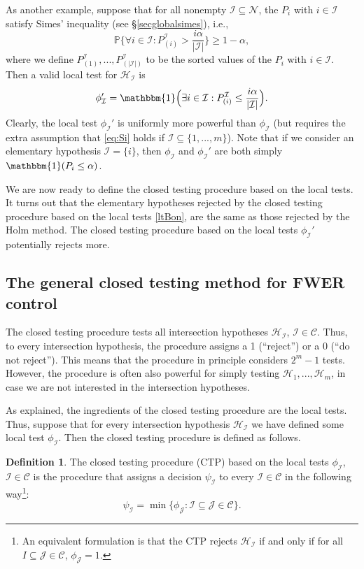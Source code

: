 \documentclass[11pt]{article}
\theoremstyle{plain}
\theoremstyle{definition}
\newtheorem{definition}{Definition}[section]
\newcommand{\N}{\mathcal{N}}
\newcommand{\I}{\mathcal{I}}
\newcommand{\J}{\mathcal{J}}
\newcommand{\Hy}{\mathcal{H}}
\newcommand{\pr}{\mathbb{P}}
\newcommand{\subs}{\mathcal{C}}
\begin{document}
As another example, suppose that for all nonempty $\I\subseteq \N$, the $P_i$ with $i\in \I$ satisfy Simes' inequality (see \S\ref{secglobalsimes}), i.e., 
\begin{equation} \label{eq:Si}
\pr\Big\{\forall i \in \I: P_{(i)}^{\I}> \frac{i\alpha}{|\I|}\Big\}\geq1-\alpha,
\end{equation}
where we define $P_{(1)}^{\I},..., P_{(|\I|)}^{\I}$ to be  the sorted values of the $P_i$ with $i\in \I$.
 Then a valid local test for 
$\Hy_{\I}$ is 
\begin{equation} \label{lotestSimes}
\phi_{\I}'=\mathbbm{1}\Big(\exists i \in \I: P_{(i)}^{\I}  \leq \frac{i\alpha}{|\I|} \Big).
\end{equation}
Clearly, the local test $\phi_{\I}'$ is uniformly more powerful than $\phi_{\I}$ (but requires the extra assumption that \eqref{eq:Si} holds if $\I\subseteq \{1,...,m\}$). Note that if we consider an elementary hypothesis $\I=\{i\}$, then $\phi_{\I}$ and $\phi_{\I}'$ are both  simply $\mathbbm{1}(P_i\leq \alpha)$.

We are now ready to define the closed testing procedure based on the local tests. It turns out that the elementary hypotheses rejected by  the closed testing procedure based on the local tests \eqref{ltBon}, are the same as those rejected by the Holm method. The closed testing procedure based on the local tests $\phi_{\I}'$ potentially rejects more.


\subsection{The general closed testing method for FWER control} \label{secCTPgeneral}
The closed testing procedure  tests  all  intersection hypotheses $\Hy_{\I}$, $\I\in \subs$. Thus, to every intersection hypothesis, the procedure assigns a 1 (``reject'') or a 0 (``do not reject''). This means that the procedure in principle  considers $2^m-1$ tests. However, the procedure is often also powerful  for simply testing $\Hy_1,...,\Hy_m$, in case we are not interested in the intersection hypotheses. 

As explained, the ingredients of the closed testing procedure are the local tests. Thus, suppose that for every intersection hypothesis $\Hy_{\I}$ we have defined some local test  $\phi_{\I}$. Then the closed testing procedure is defined as follows.

\begin{definition} \label{defctp}
The closed testing procedure (CTP) based on the local tests $\phi_{\I}$, $\I\in \subs$ is the 
procedure that assigns a  decision $\psi_{\I}$ to every $\I\in \subs$ in the following way\footnote{An equivalent formulation is  that the CTP rejects $\Hy_{\I}$ if  and only if for all $I\subseteq \J\in \subs$,  $\phi_{\J}=1.$}:
$$
\psi_{\I} = \min\{\phi_{\J}: \I\subseteq \J\in \subs\}.$$
\end{definition}
 
\end{document}
